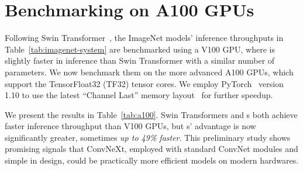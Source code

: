 \documentclass[10pt,twocolumn,letterpaper]{article}
\begin{document}

\section{Benchmarking on A100 GPUs}
\label{sec:a100}

Following Swin Transformer~\cite{Liu2021swin}, the ImageNet models' inference throughputs in Table~\ref{tab:imagenet-system} are benchmarked using a V100 GPU, where \cnn{} is slightly faster in inference than Swin Transformer with a similar number of parameters. We now benchmark them on the more advanced A100 GPUs, which support the TensorFloat32 (TF32) tensor cores. We employ PyTorch~\cite{Paszke2019} version 1.10 to use the latest ``Channel Last'' memory layout~\cite{clpytorch} for further speedup.

We present the results in Table~\ref{tab:a100}. Swin Transformers and \cnn{}s both achieve faster inference throughput than V100 GPUs, but \cnn{}s' advantage is now significantly greater, sometimes \emph{up to 49\% faster}. This preliminary study shows promising signals that ConvNeXt, employed with standard ConvNet modules and simple in design, could be practically more efficient models on modern hardwares. 
\end{document}
